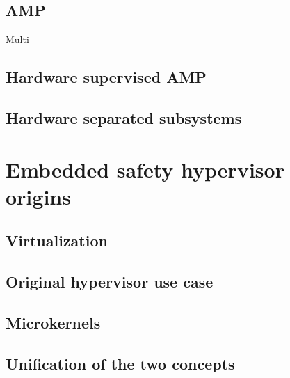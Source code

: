 \subsection{AMP}
Multi
\subsection{Hardware supervised AMP}
\subsection{Hardware separated subsystems}


\section{Embedded safety hypervisor origins}
\subsection{Virtualization}
\subsection{Original hypervisor use case}
\subsection{Microkernels}
\subsection{Unification of the two concepts}


